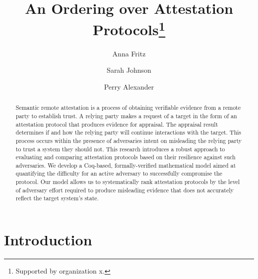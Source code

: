 \documentclass[runningheads]{llncs}
\theoremstyle{definition}
\begin{document}
%
\title{An Ordering over Attestation Protocols\thanks{Supported by organization x.}}
%
%
\author{Anna Fritz \and
Sarah Johnson \and
Perry Alexander}
%
%
%
\maketitle              %
%
\begin{abstract}
Semantic remote attestation is a process of obtaining verifiable evidence from a remote party to establish trust. A relying party makes a request of a target in the form of an attestation protocol that produces evidence for appraisal. The appraisal result determines if and how the relying party will continue interactions with the target. This process occurs within the presence of adversaries intent on misleading the relying party to trust a system they should not. This research introduces a robust approach to evaluating and comparing attestation protocols based on their resilience against such adversaries. We develop a Coq-based, formally-verified mathematical model aimed at quantifying the difficulty for an active adversary to successfully compromise the protocol. Our model allows us to systematically rank attestation protocols by the level of adversary effort required to produce misleading evidence that does not accurately reflect the target system's state.

\end{abstract}
%
%
%
\section{Introduction}
\end{document}
